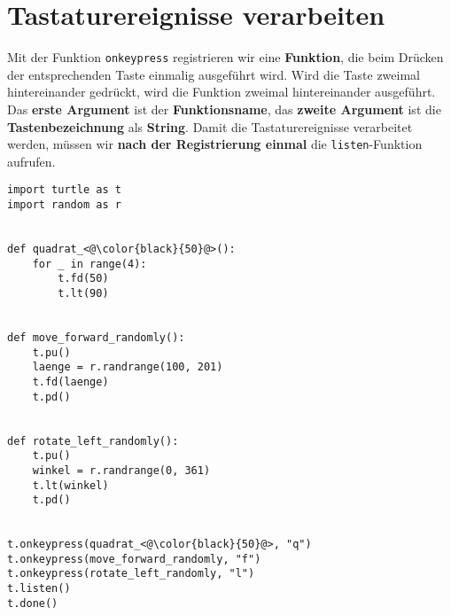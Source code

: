 \vspace{-0.5cm}

\section{Tastaturereignisse verarbeiten}

Mit der Funktion \lstinline[language={python3}]{onkeypress} registrieren wir eine \textbf{Funktion}, die beim Drücken der entsprechenden Taste einmalig ausgeführt wird. Wird die Taste zweimal hintereinander gedrückt, wird die Funktion zweimal hintereinander ausgeführt. Das \textbf{erste Argument} ist der \textbf{Funktionsname}, das \textbf{zweite Argument} ist die \textbf{Tastenbezeichnung} als \textbf{String}. Damit die Tastaturereignisse verarbeitet werden, müssen wir \textbf{nach der Registrierung einmal} die \lstinline[language={python3}]{listen}-Funktion aufrufen.

\begin{lstlisting}[language={python3}, caption={\protect\lstset{language=python3} Es werden drei Funktionen registriert. Wenn wir zum Beispiel auf die Taste \protect\say{f} drücken, dann wird die Funktion \lstinline{move_forward_randomly} ausgeführt.}, label={lst-quadrate-funktion-tastatur}]
import turtle as t
import random as r


def quadrat_<@\color{black}{50}@>():
	for _ in range(4):
		t.fd(50)
		t.lt(90)


def move_forward_randomly():
	t.pu()
	laenge = r.randrange(100, 201)
	t.fd(laenge)
	t.pd()


def rotate_left_randomly():
	t.pu()
	winkel = r.randrange(0, 361)
	t.lt(winkel)
	t.pd()


t.onkeypress(quadrat_<@\color{black}{50}@>, "q")
t.onkeypress(move_forward_randomly, "f")
t.onkeypress(rotate_left_randomly, "l")
t.listen()
t.done()

\end{lstlisting}